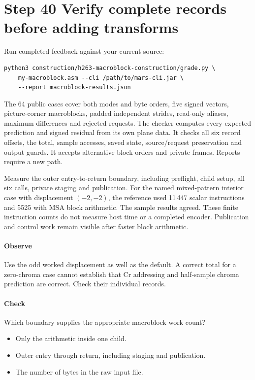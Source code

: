 \section{Step 40 Verify complete records before adding transforms}\label{h263-macroblock-s10}
Run completed feedback against your current source:
\begin{verbatim}
python3 construction/h263-macroblock-construction/grade.py \
    my-macroblock.asm --cli /path/to/mars-cli.jar \
    --report macroblock-results.json
\end{verbatim}
The 64 public cases cover both modes and byte orders, five signed vectors,
picture-corner macroblocks, padded independent strides, read-only aliases, maximum
differences and rejected requests. The checker computes every expected prediction
and signed residual from its own plane data. It checks all six record offsets,
the total, sample accesses, saved state, source/request preservation and output
guards. It accepts alternative block orders and private frames. Reports require
a new path.

Measure the outer entry-to-return boundary, including preflight, child setup,
all six calls, private staging and publication. For the named mixed-pattern
interior case with displacement $(-2,-2)$, the reference used 11\,447 scalar
instructions and 5525 with MSA block arithmetic. The sample results agreed.
These finite instruction counts do not measure host time or a completed encoder.
Publication and control work remain visible after faster block arithmetic.

\paragraph{Observe} Use the odd worked displacement as well as the default.
A correct total for a zero-chroma case cannot establish that Cr addressing and
half-sample chroma prediction are correct. Check their individual records.
\Needspace{8\baselineskip}
\paragraph{Check} Which boundary supplies the appropriate macroblock work count?
\begin{itemize}
  \item[A.] Only the arithmetic inside one child.
  \item[B.] Outer entry through return, including staging and publication.
  \item[C.] The number of bytes in the raw input file.
\end{itemize}
